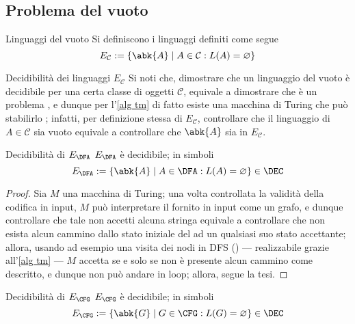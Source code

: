 \documentclass[a4paper, 12pt]{report}
\begin{document}
    \subsection{Problema del vuoto}

    \begin{frameddefn}{Linguaggi del vuoto}
        Si definiscono  i linguaggi definiti come segue $$E_\mathcal{C} := \{\abk{A} \mid A \in \mathcal{C}: L(A) = \varnothing\}$$
    \end{frameddefn}

    \begin{framedobs}{Decidibilità dei linguaggi $E_\mathcal C$}
        Si noti che, dimostrare che un linguaggio del vuoto è decidibile per una certa classe di oggetti $\mathcal{C}$, equivale a dimostrare che  è un problema , e dunque per l'\cref{alg tm} di fatto esiste una macchina di Turing che può stabilirlo ; infatti, per definizione stessa di $E_\mathcal C$, controllare che il linguaggio di $A \in \mathcal{C}$ sia vuoto equivale a controllare che $\abk{A}$ sia in $E_\mathcal{C}$.
    \end{framedobs}

    \begin{framedthm}[label={dec e_dfa}]{Decidibilità di $E_\DFA$}
        $E_\DFA$ è decidibile; in simboli $$E_\DFA := \{\abk{A} \mid A \in \DFA: L(A) = \varnothing \} \in \DEC$$
    \end{framedthm}

    \begin{proof}
        Sia $M$ una macchina di Turing; una volta controllata la validità della codifica in input, $M$ può interpretare il \DFA fornito in input come un grafo, e dunque controllare che tale \DFA non accetti alcuna stringa equivale a controllare che non esista alcun cammino dallo stato iniziale del \DFA ad un qualsiasi suo stato accettante; allora, usando ad esempio una visita dei nodi in DFS () --- realizzabile grazie all'\cref{alg tm} --- $M$ accetta se e solo se non è presente alcun cammino come descritto, e dunque non può andare in loop; allora, segue la tesi.
    \end{proof}

    \begin{framedthm}{Decidibilità di $E_\CFG$}
        $E_\CFG$ è decidibile; in simboli $$E_\CFG := \{\abk{G} \mid G \in \CFG: L(G) = \varnothing \} \in \DEC$$
    \end{framedthm}
\end{document}
